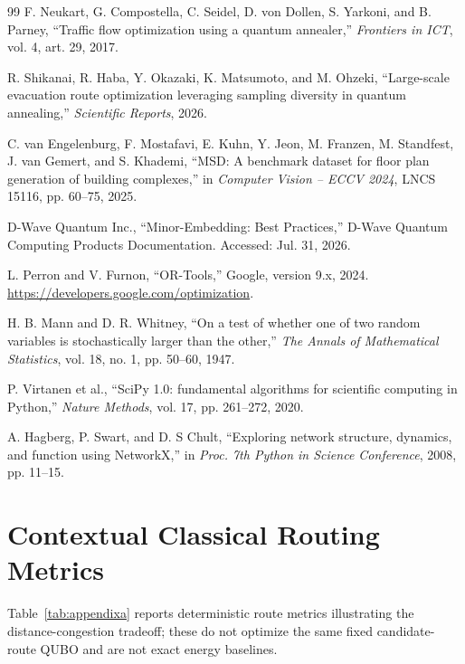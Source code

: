 \documentclass[11pt]{article}
\begin{document}
\begin{thebibliography}{99}
 F. Neukart, G. Compostella, C. Seidel, D. von Dollen, S. Yarkoni, and B. Parney, ``Traffic flow optimization using a quantum annealer,'' \textit{Frontiers in ICT}, vol. 4, art. 29, 2017.

 R. Shikanai, R. Haba, Y. Okazaki, K. Matsumoto, and M. Ohzeki, ``Large-scale evacuation route optimization leveraging sampling diversity in quantum annealing,'' \textit{Scientific Reports}, 2026.

 C. van Engelenburg, F. Mostafavi, E. Kuhn, Y. Jeon, M. Franzen, M. Standfest, J. van Gemert, and S. Khademi, ``MSD: A benchmark dataset for floor plan generation of building complexes,'' in \textit{Computer Vision -- ECCV 2024}, LNCS 15116, pp. 60--75, 2025.

 D-Wave Quantum Inc., ``Minor-Embedding: Best Practices,'' D-Wave Quantum Computing Products Documentation. Accessed: Jul. 31, 2026.

 L. Perron and V. Furnon, ``OR-Tools,'' Google, version 9.x, 2024. \url{https://developers.google.com/optimization}.

 H. B. Mann and D. R. Whitney, ``On a test of whether one of two random variables is stochastically larger than the other,'' \textit{The Annals of Mathematical Statistics}, vol. 18, no. 1, pp. 50--60, 1947.

 P. Virtanen et al., ``SciPy 1.0: fundamental algorithms for scientific computing in Python,'' \textit{Nature Methods}, vol. 17, pp. 261--272, 2020.

 A. Hagberg, P. Swart, and D. S Chult, ``Exploring network structure, dynamics, and function using NetworkX,'' in \textit{Proc. 7th Python in Science Conference}, 2008, pp. 11--15.

\end{thebibliography}

\appendix

\section{Contextual Classical Routing Metrics}
Table~\ref{tab:appendixa} reports deterministic route metrics illustrating the distance-congestion tradeoff; these do not optimize the same fixed candidate-route QUBO and are not exact energy baselines.
\end{document}
